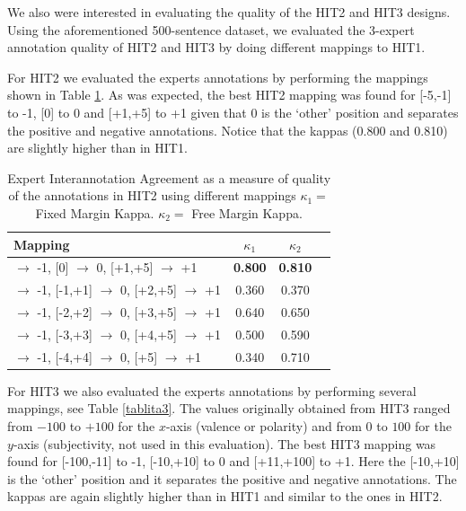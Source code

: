 \documentclass[11pt]{elsarticle}
\begin{document}

We also were interested in evaluating the quality of the
HIT2 and HIT3 designs. Using the aforementioned 500-sentence dataset, we evaluated the 3-expert annotation quality of HIT2 and HIT3 by doing different mappings to HIT1.

For HIT2 we evaluated the experts annotations by performing the mappings shown in Table \ref{tablita2}.
As was expected, the best HIT2 mapping was found for [-5,-1] to -1, [0] to 0 and [+1,+5] to +1 given that 0 is the `other' position and separates the positive and negative annotations. Notice that the kappas (0.800 and 0.810) are slightly higher than in HIT1.

\begin{table}[h]
\begin{center}
\begin{tabular}{|l|c|c|c|}
\hline
Mapping & $\kappa_{1}$ & $\kappa_{2}$ \\
\hline
[-5,-1] $\rightarrow$ -1, [0] $\rightarrow$ 0, [+1,+5] $\rightarrow$ +1& \textbf{0.800} & \textbf{0.810}\\ \hline
[-5,-2] $\rightarrow$ -1, [-1,+1] $\rightarrow$ 0, [+2,+5] $\rightarrow$ +1& 0.360 & 0.370\\ \hline
[-5,-3] $\rightarrow$ -1, [-2,+2] $\rightarrow$ 0, [+3,+5] $\rightarrow$ +1& 0.640 & 0.650\\ \hline
[-5,-4] $\rightarrow$ -1, [-3,+3] $\rightarrow$ 0, [+4,+5] $\rightarrow$ +1& 0.500 & 0.590\\ \hline
[-5] $\rightarrow$ -1, [-4,+4] $\rightarrow$ 0, [+5] $\rightarrow$ +1& 0.340 & 0.710\\ \hline
\end{tabular}
\end{center}
\caption{Expert Interannotation Agreement as a measure of quality of the annotations in HIT2 using different mappings $\kappa_{1} = $ Fixed Margin Kappa. $\kappa_{2} = $ Free Margin Kappa.}
\label{tablita2}
\end{table}


For HIT3 we also evaluated the experts annotations by performing several mappings, see Table \ref{tablita3}. The values originally obtained from HIT3 ranged from $-100$ to $+100$ for the $x$-axis (valence or polarity) and from $0$ to $100$ for the $y$-axis (subjectivity, not used in this evaluation).
The best HIT3 mapping was found for [-100,-11] to -1, [-10,+10] to 0 and [+11,+100] to +1. Here the [-10,+10] is the `other' position and it separates the positive and negative annotations. The kappas are again slightly higher than in HIT1 and similar to the ones in HIT2.
\end{document}

